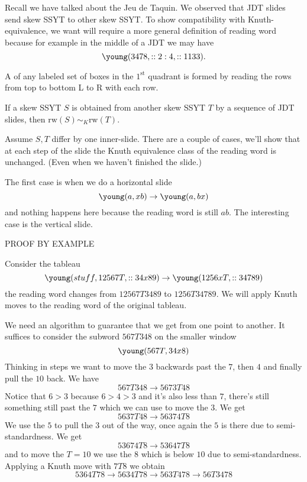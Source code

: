 \documentclass[12pt]{memoir}
\begin{document}
Recall we have talked about the Jeu de Taquin. We observed that JDT slides send skew SSYT to other skew SSYT. To show compatibility with Knuth-equivalence, we want will require a more general definition of reading word because for example in the middle of a JDT we may have 
$$\young(3478,::2:4,::1133).$$

\begin{Def}
    A  of any labeled set of boxes in the $1^{\text{st}}$ quadrant is formed by reading the rows from top to bottom L to R with each row.
\end{Def}

\begin{Lem}
    If a skew SSYT $S$ is obtained from another skew SSYT $T$ by a sequence of JDT slides, then $\text{rw}(S)\sim_K\text{rw}(T)$.
\end{Lem}
\begin{ptcbp}
    Assume $S,T$ differ by one inner-slide. There are a couple of cases, we'll show that at each step of the slide the Knuth equivalence class of the reading word is unchanged. (Even when we haven't finished the slide.)\par 
    The first case is when we do a horizontal slide 
    $$\young(a,xb)\to \young(a,bx)$$
    and nothing happens here because the reading word is still $ab$. The interesting case is the vertical slide.\par 
PROOF BY EXAMPLE
\end{ptcbp}

\begin{Ex}
    Consider the tableau 
    $$\young(stuff,12567T,::34x89)\to\young(1256xT,::34789)$$
    the reading word changes from $12567T3489$ to $1256T34789$. We will apply Knuth moves to the reading word of the original tableau.\par 
    We need an algorithm to guarantee that we get from one point to another. It suffices to consider the subword $567T348$ on the smaller window 
    $$\young(567T,34x8)$$
    Thinking in steps we want to move the $3$ backwards past the $7$, then $4$ and finally pull the $10$ back. We have 
    $$567T348\to 5673T48$$
    Notice that $6>3$ because $6>4>3$ and it's also less than $7$, there's still something still past the $7$ which we can use to move the $3$. We get 
    $$5637T48\to56374T8$$
    We use the $5$ to pull the $3$ out of the way, once again the $5$ is there due to semi-standardness. We get 
    $$53674T8\to 53647T8$$
    and to move the $T=10$ we use the $8$ which is below $10$ due to semi-standardness. Applying a Knuth  move with $7T8$ we obtain 
    $$5364T78\to 5634T78\to563T478\to 56T3478$$ 
\end{Ex}
\end{document}
